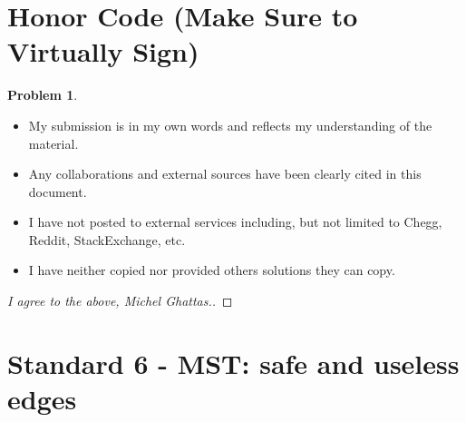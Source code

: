 \documentclass[11pt]{article}
\theoremstyle{definition}
\theoremstyle{definition}
\newtheorem{required}{Problem}
\theoremstyle{definition}
\begin{document}
\section{Honor Code (Make Sure to Virtually Sign)} \label{HonorCode}

\begin{required}
\begin{itemize}
\item My submission is in my own words and reflects my understanding of the material.
\item Any collaborations and external sources have been clearly cited in this document.
\item I have not posted to external services including, but not limited to Chegg, Reddit, StackExchange, etc.
\item I have neither copied nor provided others solutions they can copy.
\end{itemize}

\end{required}

\begin{proof}[I agree to the above, Michel Ghattas.]
\end{proof}



\newpage
\section{Standard 6 - MST: safe and useless edges}
\end{document}
